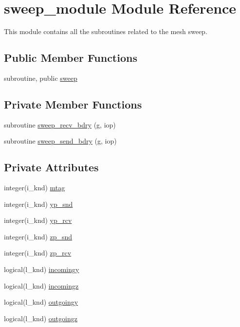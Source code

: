 \hypertarget{classsweep__module}{\section{sweep\-\_\-module Module Reference}
\label{classsweep__module}
}


This module contains all the subroutines related to the mesh sweep.  


\subsection*{Public Member Functions}
\begin{DoxyCompactItemize}
\item 
subroutine, public \hyperlink{classsweep__module_a45a5eecf232e44843a1c763f5ce7c4eb}{sweep}
\end{DoxyCompactItemize}
\subsection*{Private Member Functions}
\begin{DoxyCompactItemize}
\item 
subroutine \hyperlink{classsweep__module_a3603dc59f232d8d9309bb434f09b9c53}{sweep\-\_\-recv\-\_\-bdry} (g, iop)
\item 
subroutine \hyperlink{classsweep__module_a4eb92bcf3c9cd5265030a030fe7c7937}{sweep\-\_\-send\-\_\-bdry} (g, iop)
\end{DoxyCompactItemize}
\subsection*{Private Attributes}
\begin{DoxyCompactItemize}
\item 
integer(i\-\_\-knd) \hyperlink{classsweep__module_a39fa545755e54cbd311b4fe016cfa439}{mtag}
\item 
integer(i\-\_\-knd) \hyperlink{classsweep__module_a1aab688bcb2aaa33a5bf60e57385d575}{yp\-\_\-snd}
\item 
integer(i\-\_\-knd) \hyperlink{classsweep__module_a709eb6789a39f6937645ba7022192e99}{yp\-\_\-rcv}
\item 
integer(i\-\_\-knd) \hyperlink{classsweep__module_a5d8635df65a44c026ab27c08910d91d8}{zp\-\_\-snd}
\item 
integer(i\-\_\-knd) \hyperlink{classsweep__module_a2e606e13d5d6df88605a757235d90f15}{zp\-\_\-rcv}
\item 
logical(l\-\_\-knd) \hyperlink{classsweep__module_a2169c5c3d0b58d4481c11c192d77139d}{incomingy}
\item 
logical(l\-\_\-knd) \hyperlink{classsweep__module_a0a5733d013646bed24b58e6e63c1f348}{incomingz}
\item 
logical(l\-\_\-knd) \hyperlink{classsweep__module_a951a915875e576860980173b5ae9f23d}{outgoingy}
\item 
logical(l\-\_\-knd) \hyperlink{classsweep__module_a219e782e7e79e82858addb91583fcae8}{outgoingz}
\end{DoxyCompactItemize}


